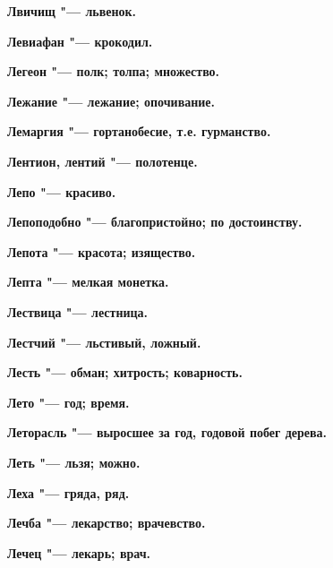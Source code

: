 \bfseries Лвичищ \normalfont{} "--- львенок. 




\bfseries Левиафан \normalfont{} "--- крокодил. 




\bfseries Легеон \normalfont{} "--- полк; толпа; множество. 




\bfseries Лежание \normalfont{} "--- лежание; опочивание. 




\bfseries Лемаргия \normalfont{} "--- гортанобесие, т.е. гурманство. 




\bfseries Лентион, лентий \normalfont{} "--- полотенце. 




\bfseries Лепо \normalfont{} "--- красиво. 




\bfseries Лепоподобно \normalfont{} "--- благопристойно; по достоинству. 




\bfseries Лепота \normalfont{} "--- красота; изящество. 




\bfseries Лепта \normalfont{} "--- мелкая монетка. 




\bfseries Лествица \normalfont{} "--- лестница. 




\bfseries Лестчий \normalfont{} "--- льстивый, ложный. 




\bfseries Лесть \normalfont{} "--- обман; хитрость; коварность. 




\bfseries Лето \normalfont{} "--- год; время. 




\bfseries Леторасль \normalfont{} "--- выросшее за год, годовой побег дерева. 




\bfseries Леть \normalfont{} "--- льзя; можно. 




\bfseries Леха \normalfont{} "--- гряда, ряд. 




\bfseries Лечба \normalfont{} "--- лекарство; врачевство. 




\bfseries Лечец \normalfont{} "--- лекарь; врач. 




